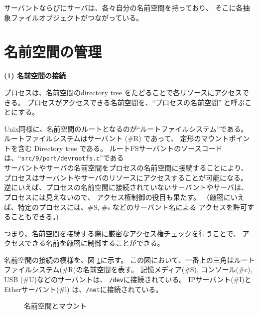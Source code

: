 サーバントならびにサーバは、各々自分の名前空間を持っており、
そこに各抽象ファイルオブジェクトがつながっている。


\section{ 名前空間の管理}


{\bf\flushleft (1) 名前空間の接続}

  プロセスは、名前空間のdirectory tree をたどることで各リソースにアクセスできる。
プロセスがアクセスできる名前空間を、``プロセスの名前空間'' と呼ぶことにする。

  Unix同様に、名前空間のルートとなるのが``ルートファイルシステム''である。  
ルートファイルシステムはサーバント (\#R) であって、
定形のマウントポイントを含む Directory tree である。
ルートFSサーバントのソースコードは、``{\tt src/9/port/devrootfs.c}''である
\\

サーバントやサーバの名前空間をプロセスの名前空間に接続することにより、
プロセスはサーバントやサーバのリソースにアクセスすることが可能になる。
逆にいえば、プロセスの名前空間に接続されていないサーバントやサーバは、
プロセスには見えないので、
アクセス権制御の役目も果たす。
（厳密にいえば、特定のプロセスには、\#S, \#s などのサーバント名による
  アクセスを許可することもできる。)

つまり、名前空間を接続する際に厳密なアクセス権チェックを行うことで、
アクセスできる名前を厳密に制御することができる。


名前空間の接続の模様を、図 \ref{fig:NSmount}に示す。
この図において、一番上の三角はルートファイルシステム(\#R)の名前空間を表す。
記憶メディア(\#S), コンソール(\#c), USB (\#U)などのサーバントは、
{\tt /dev}に接続されている。
IPサーバント(\#I)とEtherサーバント(\#l) は、{\tt /net}に接続されている。

\begin{figure}[htb]
  \begin{center}
   \epsfxsize=440pt
    \caption{名前空間とマウント}
    \label{fig:NSmount}
  \end{center}
\end{figure}


